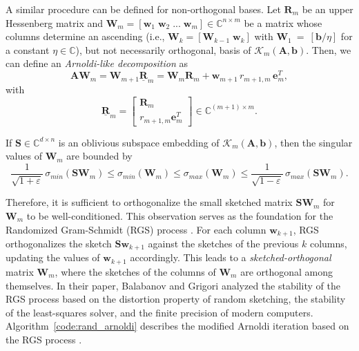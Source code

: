 \documentclass[smallextended]{svjour3}
\renewcommand{\vec}[1]{\mathbf{#1}}
\newcommand{\mat}[1]{\mathbf{#1}}
\begin{document}
A similar procedure can be defined for non-orthogonal bases. Let $\mat{R}_m$ be an upper Hessenberg matrix and $\mat{W}_m = [\vec{w}_1 \; \vec{w}_2 \; ... \; \vec{w}_m] \in \mathbb{C}^{n \times m}$ be a matrix whose columns determine an ascending (i.e., $\mat{W}_k = [\mat{W}_{k - 1} \; \vec{w}_k]$ with $\mat{W}_1~=~[\vec{b} / \eta]$ for a constant $\eta \in \mathbb{C}$), but not necessarily orthogonal, basis of $\mathcal{K}_m(\mat{A}, \vec{b})$. Then, we can define an \textit{Arnoldi-like decomposition} \cite{eiermann_restarted_2006} as
\begin{equation}
\label{eq:rand_arnoldi}
\mat{A} \mat{W}_m = \mat{W}_{m + 1} \mat{\underline{R}}_m =  \mat{W}_{m} \mat{R}_m + \vec{w}_{m + 1} \, r_{m + 1, m} \, \vec{e}^T_m,
\end{equation}
with
\begin{equation*}
\mat{\underline{R}}_m = \begin{bmatrix} \mat{R}_{m} \\ r_{m + 1, m} \vec{e}_m^T \end{bmatrix} \in \mathbb{C}^{(m + 1) \times m}.
\end{equation*}

\begin{lemma}
 If $\mat{S} \in \mathbb{C}^{d \times n}$ is an oblivious subspace embedding of $\mathcal{K}_m(\mat{A}, \vec{b})$, then the singular values of $\mat{W}_m$ are bounded by
\begin{equation}
\label{eq:singular_bound}
\frac{1}{\sqrt{1 + \varepsilon}} \, \sigma_{min}(\mat{S W}_m) \leq \sigma_{min}(\mat{W}_m) \leq \sigma_{max}(\mat{W}_m) \leq \frac{1}{\sqrt{1 - \varepsilon}} \, \sigma_{max}(\mat{S W}_m).
\end{equation}
\end{lemma}

Therefore, it is sufficient to orthogonalize the small sketched matrix $\mat{S W}_m$ for $\mat{W}_m$ to be well-conditioned.
This observation serves as the foundation for the Randomized Gram-Schmidt (RGS) process \cite{balabanov_randomized_2022,timsit_randomized_2023}. For each column $\vec{w}_{k + 1}$, RGS orthogonalizes the sketch $\mat{S}\vec{w}_{k + 1}$ against the sketches of the previous $k$ columns, updating the values of $\vec{w}_{k + 1}$ accordingly. This leads to a \textit{sketched-orthogonal} matrix $\mat{W}_m$, where the sketches of the columns of $\mat{W}_m$ are orthogonal among themselves. In their paper, Balabanov and Grigori \cite{balabanov_randomized_2022} analyzed the stability of the RGS process based on the distortion property of random sketching, the stability of the least-squares solver, and the finite precision of modern computers.
Algorithm~\ref{code:rand_arnoldi} describes the modified Arnoldi iteration based on the RGS process \cite{timsit_randomized_2023}.
\end{document}
